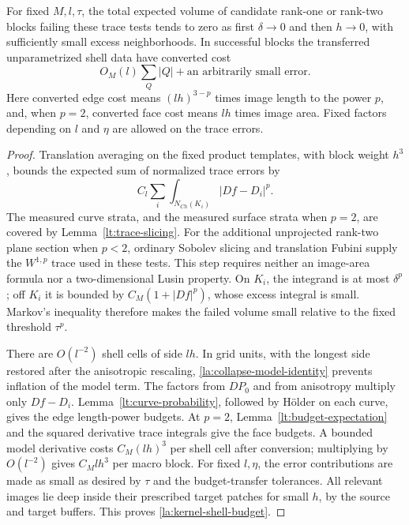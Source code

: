 \begin{lemma}\label{la:kernel-selection}
For fixed $M,l,\tau$, the total expected volume of candidate
rank-one or rank-two blocks failing these trace tests tends to zero
as first $\delta\to0$ and then $h\to0$, with sufficiently small
excess neighborhoods.  In successful blocks the transferred
unparametrized shell data have converted cost
\begin{equation}\label{la:kernel-shell-budget}
 O_M(l)\sum_Q|Q|+\text{an arbitrarily small error}.
\end{equation}
Here converted edge cost means $(lh)^{3-p}$ times image length to the
power $p$, and, when $p=2$, converted face cost means $lh$ times
image area.  Fixed factors depending on $l$ and $\eta$ are allowed
on the trace errors.
\end{lemma}

\begin{proof}
Translation averaging on the fixed product templates, with block
weight $h^3$, bounds the expected sum of normalized trace errors by
\begin{equation}\label{la:trace-test-expectation}
 C_l\sum_i\int_{N_{Ch}(K_i)}|Df-D_i|^p.
\end{equation}
The measured curve strata, and the measured surface strata when $p=2$,
are covered by Lemma~\ref{lt:trace-slicing}. For the additional
unprojected rank-two plane section when $p<2$, ordinary Sobolev slicing
and translation Fubini supply the $W^{1,p}$ trace used in these tests.
This step requires neither an image-area formula nor a two-dimensional
Lusin property. On $K_i$, the integrand is at most
$\delta^p$; off $K_i$ it is bounded by
$C_M(1+|Df|^p)$, whose excess integral is small.  Markov's inequality
therefore makes the failed volume small relative to the fixed
threshold $\tau^p$.

There are $O(l^{-2})$ shell cells of side $lh$.  In grid units, with
the longest side restored after the anisotropic rescaling,
\eqref{la:collapse-model-identity} prevents inflation of the model
term.  The factors from $DP_0$ and from anisotropy multiply only
$Df-D_i$.  Lemma~\ref{lt:curve-probability}, followed by H\"older
on each curve, gives the edge length-power budgets.  At $p=2$,
Lemma~\ref{lt:budget-expectation} and the squared derivative trace
integrals give the face budgets.  A bounded model derivative costs
$C_M(lh)^3$ per shell cell after conversion; multiplying by
$O(l^{-2})$ gives $C_Mlh^3$ per macro block.  For fixed $l,\eta$, the
error contributions are made as small as desired by $\tau$ and the
budget-transfer tolerances.  All relevant images lie deep inside
their prescribed target patches for small $h$, by the source and
target buffers.  This proves \eqref{la:kernel-shell-budget}.
\end{proof}

